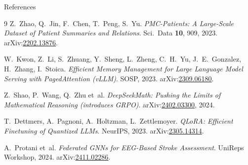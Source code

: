 \documentclass[aspectratio=169,t]{beamer}
\begin{document}
\begin{frame}[allowframebreaks]{References}
\begin{thebibliography}{9}
      Z.~Zhao, Q.~Jin, F.~Chen, T.~Peng, S.~Yu.
      \newblock \emph{PMC-Patients: A Large-Scale Dataset of Patient
                     Summaries and Relations}.
      \newblock Sci.\ Data \textbf{10}, 909, 2023.
      \newblock arXiv:\href{https://arxiv.org/abs/2202.13876}{2202.13876}.

      W.~Kwon, Z.~Li, S.~Zhuang, Y.~Sheng, L.~Zheng, C.~H.~Yu,
      J.~E.~Gonzalez, H.~Zhang, I.~Stoica.
      \newblock \emph{Efficient Memory Management for Large Language
                     Model Serving with PagedAttention (vLLM)}.
      \newblock SOSP, 2023.
      \newblock arXiv:\href{https://arxiv.org/abs/2309.06180}{2309.06180}.

      Z.~Shao, P.~Wang, Q.~Zhu et~al.
      \newblock \emph{DeepSeekMath: Pushing the Limits of Mathematical
                     Reasoning (introduces GRPO)}.
      \newblock arXiv:\href{https://arxiv.org/abs/2402.03300}{2402.03300}, 2024.

      T.~Dettmers, A.~Pagnoni, A.~Holtzman, L.~Zettlemoyer.
      \newblock \emph{QLoRA: Efficient Finetuning of Quantized LLMs}.
      \newblock NeurIPS, 2023.
      \newblock arXiv:\href{https://arxiv.org/abs/2305.14314}{2305.14314}.

      A.~Protani et~al.
      \newblock \emph{Federated GNNs for EEG-Based Stroke Assessment}.
      \newblock UniReps Workshop, 2024.
      \newblock arXiv:\href{https://arxiv.org/abs/2411.02286}{2411.02286}.
  \end{thebibliography}
\end{frame}

\makeend
\end{document}
